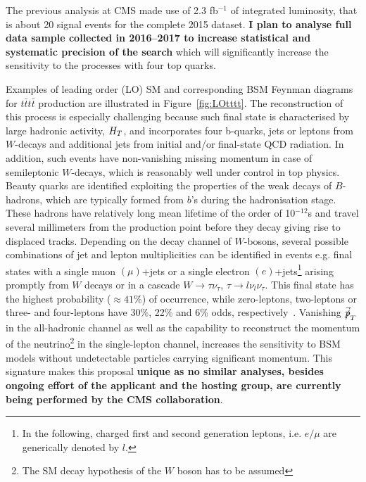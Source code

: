 The previous analysis at CMS made use of 2.3 fb$^{-1}$ of integrated luminosity, that is about 20 signal events for the complete 2015 dataset. \textbf{I plan to analyse full data sample collected in 2016--2017 to increase statistical and systematic precision of the search} which will significantly increase the sensitivity to the processes with four top quarks. 

Examples of leading order (LO) SM and corresponding BSM Feynman diagrams for $t\bar{t}t\bar{t}$ production are illustrated in Figure~\ref{fig:LOtttt}. The reconstruction of this process is especially challenging because such final state is characterised by large hadronic activity, $\mbox{$H_T$}$, and incorporates four b-quarks, jets or leptons from $W$-decays and additional jets from initial and/or final-state QCD radiation. In addition, such events have non-vanishing missing momentum in case of semileptonic $W$-decays, which is reasonably well under control in top physics. Beauty quarks are identified exploiting the properties of the weak decays of $B$-hadrons, which are typically formed from $b$'s during the hadronisation stage. These hadrons have relatively long mean lifetime of the order of 10$^{-12}$s and travel several millimeters from the production point before they decay giving rise to displaced tracks. Depending on the decay channel of $W$-bosons, several possible combinations of jet and lepton multiplicities can be identified in \fourtop events e.g. final states with a single muon $\left(\mu\right)$+jets or a single electron $\left(e\right)$+jets\footnote{In the following, charged first and second generation leptons, i.e. $e/\mu$ are generically denoted by $l$.} arising promptly from $W$ decays or in a cascade $W\rightarrow\tau\nu_\tau$, $\tau\rightarrow l\nu_l \nu_\tau$. This final state has the highest probability ($\approx 41\%$) of occurrence, while zero-leptons, two-leptons or three- and four-leptons have 30\%, 22\% and 6\% odds, respectively~\cite{Khachatryan:2014sca}.  Vanishing $\mbox{$\vec{\slashed{p}}_T$}$ in the all-hadronic channel as well as the capability to reconstruct the momentum of the neutrino\footnote{The SM decay hypothesis of the $W$ boson has to be assumed} in the single-lepton channel, increases the sensitivity to BSM models without undetectable particles carrying significant momentum. This signature makes this proposal \textbf{unique as no similar analyses, besides ongoing effort of the applicant and the hosting group, are currently being performed by the CMS collaboration}.

